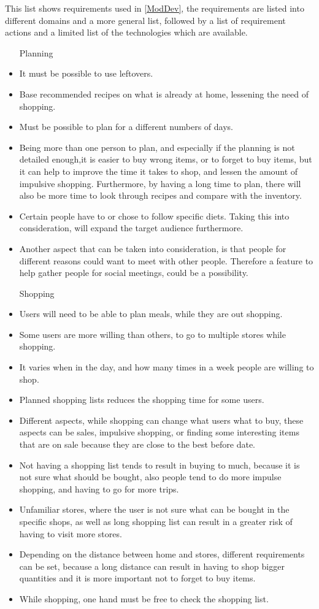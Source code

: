 This list shows requirements used in \cref{ModDev}, the requirements are listed into different domains and a more general list, followed by a list of requirement actions and a limited list of the technologies which are available.
\begin{itemize}
  \item[Planning]
    \item It must be possible to use leftovers.
    \item Base recommended recipes on what is already at home, lessening the need of shopping.
    \item Must be possible to plan for a different numbers of days.
    \item Being more than one person to plan, and especially if the planning is not detailed enough,it is easier to buy wrong items, or to forget to buy items, but it can help to improve the time it takes to shop, and lessen the amount of impulsive shopping. Furthermore, by having a long time to plan, there will also be more time to look through recipes and compare with the inventory.
    \item Certain people have to or chose to follow specific diets. Taking this into consideration, will expand the target audience furthermore.
    \item Another aspect that can be taken into consideration, is that people for different reasons could want to meet with other people. Therefore a feature to help gather people for social meetings, could be a possibility.
  
  \item[Shopping]
    \item Users will need to be able to plan meals, while they are out shopping.  
    \item Some users are more willing than others, to go to multiple stores while shopping.
    \item It varies when in the day, and how many times in a week people are willing to shop.
    \item Planned shopping lists reduces the shopping time for some users.
    \item Different aspects, while shopping can change what users what to buy, these aspects can be sales, impulsive shopping, or finding some interesting items that are on sale because they are close to the best before date.
    \item Not having a shopping list tends to result in buying to much, because it is not sure what should be bought, also people tend to do more impulse shopping, and having to go for more trips.
    \item Unfamiliar stores, where the user is not sure what can be bought in the specific shops, as well as long shopping list can result in a greater risk of having to visit more stores.
    \item Depending on the distance between home and stores, different requirements can be set, because a long distance can result in having to shop bigger quantities and it is more important not to forget to buy items.
    \item While shopping, one hand must be free to check the shopping list.
    

\end{itemize}
